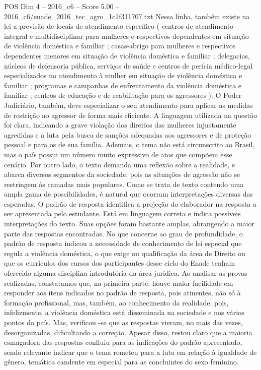 \begin{textsample}{POS Dim 4 – 2016\_c6 – Score 5.00 – 2016\_c6/enade\_2016\_tec\_agro\_1c1f311707.txt}
Nessa linha, também existe na lei a previsão de locais de atendimento específico ( centros de atendimento integral e multidisciplinar para mulheres e respectivos dependentes em situação de violência doméstica e familiar ; casas-abrigo para mulheres e respectivos dependentes menores em situação de violência doméstica e familiar ; delegacias, núcleos de defensoria pública, serviços de saúde e centros de perícia médico-legal especializados no atendimento à mulher em situação de violência doméstica e familiar ; programas e campanhas de enfrentamento da violência doméstica e familiar ; centros de educação e de reabilitação para os agressores ).
O Poder Judiciário, também, deve especializar o seu atendimento para aplicar as medidas de restrição ao agressor de forma mais eficiente.
A linguagem utilizada na questão foi clara, indicando a grave violação dos direitos das mulheres injustamente agredidas e a luta pela busca de sanções adequadas aos agressores e de proteção pessoal e para os de sua família.
Ademais, o tema não está circunscrito ao Brasil, mas o país possui um número muito expressivo de atos que compõem esse cenário.
Por outro lado, o texto demanda uma reflexão sobre a realidade, e abarca diversos segmentos da sociedade, pois as situações de agressão não se restringem às camadas mais populares.
Como se trata de texto contendo uma ampla gama de possibilidades, é natural que ocorram interpretações diversas das esperadas.
O padrão de resposta identifica a projeção do elaborador na resposta a ser apresentada pelo estudante.
Está em linguagem correta e indica possíveis interpretações do texto.
Suas opções foram bastante amplas, abrangendo a maior parte das respostas encontradas.
No que concerne ao grau de profundidade, o padrão de resposta indicou a necessidade de conhecimento de lei especial que regula a violência doméstica, o que exige ou qualificação da área de Direito ou que os currículos dos cursos dos participantes desse ciclo do Enade tenham oferecido alguma disciplina introdutória da área jurídica.
Ao analisar as provas realizadas, constatamos que, na primeira parte, houve maior facilidade em responder aos itens indicados no padrão de resposta, pois atinentes, não só à formação profissional, mas, também, ao conhecimento da realidade, pois, infelizmente, a violência doméstica está disseminada na sociedade e nos vários pontos do país.
Mas, verificou -se que as respostas vieram, no mais das vezes, desorganizadas, dificultando a correção.
Apesar disso, restou claro que a maioria esmagadora das respostas confluiu para as indicações do padrão apresentado, sendo relevante indicar que o tema remeteu para a luta em relação à igualdade de gênero, temática candente em especial para as concluintes do sexo feminino.

\end{textsample}

